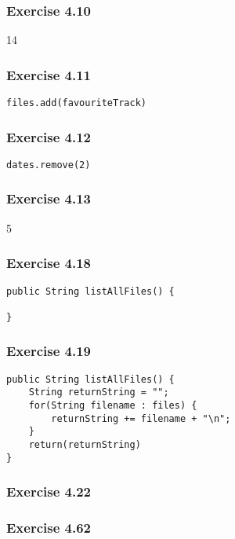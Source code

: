 \subsubsection{Exercise 4.10}
14

\subsubsection{Exercise 4.11}
\begin{lstlisting}
files.add(favouriteTrack)
\end{lstlisting}

\subsubsection{Exercise 4.12}
\begin{lstlisting}
dates.remove(2)
\end{lstlisting}

\subsubsection{Exercise 4.13}
5

\subsubsection{Exercise 4.18}
\begin{lstlisting}
public String listAllFiles() {
    
}
\end{lstlisting}

\subsubsection{Exercise 4.19}
\begin{lstlisting}
public String listAllFiles() {
    String returnString = "";
    for(String filename : files) {
        returnString += filename + "\n";
    }
    return(returnString)
}
\end{lstlisting}

\subsubsection{Exercise 4.22}


\subsubsection{Exercise 4.62}


